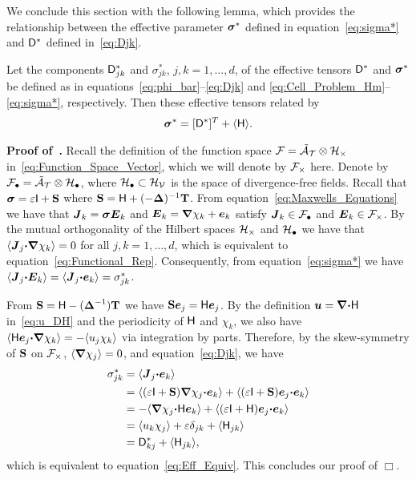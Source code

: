 \documentclass[amsa]{ipart}
\begin{document}
We conclude this section with the following lemma, which provides
the relationship between the effective parameter $\mbox{\boldmath${\sigma}$}^*$ defined in
equation~\eqref{eq:sigma*} and $\mathsf{D}^*$ defined in~\eqref{eq:Djk}.
%
\begin{lemma}\label{lem:kappa_sigma}
%
Let the components $\mathsf{D}^*_{jk}$ and $\sigma^*_{jk}$, $j,k=1,\ldots,d$, of the
effective tensors $\mathsf{D}^*$ and $\mbox{\boldmath${\sigma}$}^*$ be defined as in
equations~\eqref{eq:phi_bar}--\eqref{eq:Djk} and
\eqref{eq:Cell_Problem_Hm}--\eqref{eq:sigma*}, respectively. Then  
these effective tensors related by 
% 
\begin{align}\label{eq:Eff_Equiv}
  \bsig^*=[\Dm^*]^T+\langle\Hm\rangle.
\end{align}
%
\end{lemma}
%
%
\textbf{Proof of~.}\hspace{1ex}
%
Recall the definition of the function space
$\mathcal{F}=\tilde{\mathcal{A}}_{\mathcal{T}}\otimes\mathcal{H}_\times$ in~\eqref{eq:Function_Space_Vector},
which we will denote by $\mathcal{F}_\times$ here. Denote by
$\mathcal{F}_\bullet=\tilde{\mathcal{A}}_{\mathcal{T}}\otimes\mathcal{H}_\bullet$, where $\mathcal{H}_\bullet\subset\mathcal{H}_{\mathcal{V}}$ is the space
of divergence-free fields. Recall that $\mbox{\boldmath${\sigma}$}=\varepsilon\mathsf{I}+\mathbf{S}$ where
$\mathbf{S}=\mathsf{H}+(-\mbox{\boldmath${\Delta}$})^{-1}\mathbf{T}$.  From equation~\eqref{eq:Maxwells_Equations} we
have that $\boldsymbol{J}_k=\mbox{\boldmath${\sigma}$}\boldsymbol{E}_k$ and $\boldsymbol{E}_k=\mbox{\boldmath${\nabla}$} \chi_k+\boldsymbol{e}_k$
satisfy $\boldsymbol{J}_k\in\mathcal{F}_\bullet$ and $\boldsymbol{E}_k\in\mathcal{F}_\times$. By the mutual
orthogonality of the Hilbert spaces $\mathcal{H}_\times$ and $\mathcal{H}_\bullet$ we have that
$\langle\boldsymbol{J}_j\mbox{\boldmath${\cdot}$}\mbox{\boldmath${\nabla}$} \chi_k\rangle=0$ for all $j,k=1,\ldots,d$, which is
equivalent to equation~\eqref{eq:Functional_Rep}. Consequently, from
equation~\eqref{eq:sigma*} we have
$\langle\boldsymbol{J}_j\mbox{\boldmath${\cdot}$}\boldsymbol{E}_k\rangle=\langle\boldsymbol{J}_j\mbox{\boldmath${\cdot}$}\boldsymbol{e}_k\rangle=\sigma^*_{jk}$.


From $\mathbf{S}=\mathsf{H}-(\mbox{\boldmath${\Delta}$}^{-1})\mathbf{T}$ we have
$\mathbf{S}\boldsymbol{e}_j=\mathsf{H}\boldsymbol{e}_j$. By the definition $\boldsymbol{u} =\mbox{\boldmath${\nabla}$} \mbox{\boldmath${\cdot}$}\mathsf{H}$
in~\eqref{eq:u_DH} and the periodicity of $\mathsf{H}$ and $\chi_k$, we also
have 
$\langle\mathsf{H}\boldsymbol{e}_j\mbox{\boldmath${\cdot}$}\mbox{\boldmath${\nabla}$} \chi_k\rangle=-\langle u_j\chi_k\rangle$ via integration by
parts. Therefore, by the skew-symmetry of $\mathbf{S}$ on $\mathcal{F}_\times$,
$\langle\mbox{\boldmath${\nabla}$}\chi_j\rangle=0$, and equation~\eqref{eq:Djk}, we have 
%
\begin{align}
  \sigma^*_{jk}&=\langle\vecJ_j\bcdot\vece_k\rangle
      \\\notag
      &=\langle(\varepsilon\Ib+\Sb)\bnabla\chi_j\bcdot\vece_k\rangle
      +\langle(\varepsilon\Ib+\Sb)\vece_j\bcdot\vece_k\rangle
      \\\notag
      &=-\langle\bnabla\chi_j\bcdot\Hm\vece_k\rangle
      +\langle(\varepsilon\Ib+\Hm)\vece_j\bcdot\vece_k\rangle
      \\\notag
      &=\langle u_k\chi_j\rangle+\varepsilon\delta_{jk}+\langle\Hm_{jk}\rangle
      \\\notag
      &=\Dm^*_{kj}+\langle\Hm_{jk}\rangle,
\end{align}
%
which is equivalent to equation~\eqref{eq:Eff_Equiv}. This concludes
our proof of  $\Box$.     
\end{document}
